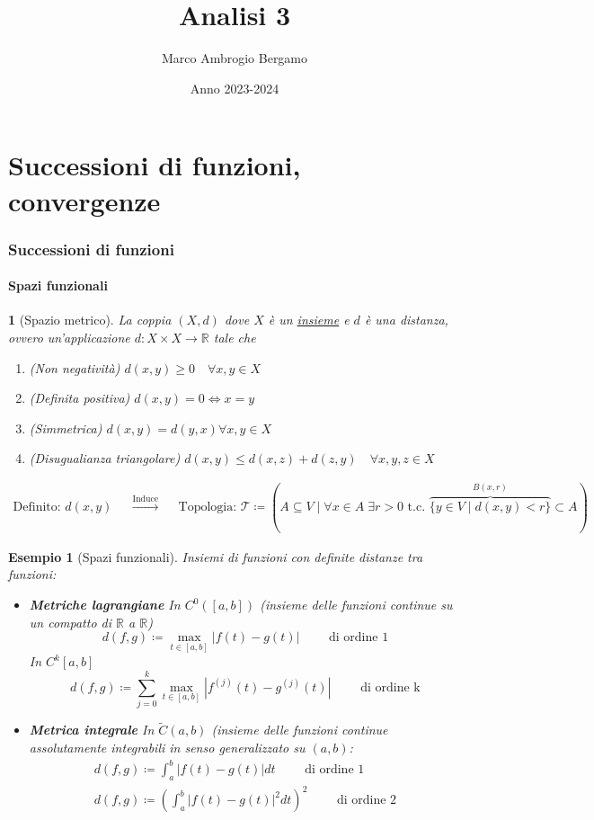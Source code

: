 \documentclass[a4paper,10pt]{article}
\title{\textbf{Analisi 3}}
\author{Marco Ambrogio Bergamo}
\date{Anno 2023-2024}
\newcommand{\re}{\mathbb{R}} %
\theoremstyle{indentdefinition}
\theoremstyle{indenttheorem}
\theoremstyle{myremark}
\newtheorem{es}{Esempio}
\theoremstyle{indentgeneral}
\newtheorem*{gen}{}
\begin{document}
\maketitle
\tableofcontents{}

\part{Successioni di funzioni, convergenze}
\section{Successioni di funzioni}
\subsection{Spazi funzionali}

\begin{gen}[Spazio metrico]
    La coppia $(X, d)$ dove $X$ è un \underline{insieme} e $d$ è una distanza, ovvero un'applicazione $d: X\times X \to \re$ tale che
    \begin{enumerate}
        \item (Non negatività) $d(x,y)\ge 0 \quad \forall x,y\in X$
        \item (Definita positiva) $d(x,y)=0 \iff x=y$
        \item (Simmetrica) $d(x,y)=d(y,x) \forall x,y\in X $
        \item (Disugualianza triangolare) $d(x,y)\le d(x,z)+d(z,y) \quad \forall x,y,z\in X$
    \end{enumerate}
    \begin{align*}
        \text{Definito: } d(x,y) & & \overset{\text{Induce}}{\longrightarrow} & &\text{Topologia: } \mathcal{T} \coloneqq (A\subseteq V \mid \forall x\in A \; \exists r>0 \text{ t.c. } \overbrace{\{y\in V\mid d(x,y)<r\}}^{B(x,r)}\subset A)
\end{align*}
\end{gen}

\begin{es}[Spazi funzionali] Insiemi di funzioni con definite distanze tra funzioni:
\begin{itemize}
    \item \textbf{Metriche lagrangiane} In $C^0([a,b])$ (insieme delle funzioni continue su un compatto di $\re$ a $\re$)
    $$d(f,g)\coloneqq\max_{t\in[a,b]}|f(t)-g(t)| \qquad\text{ di ordine 1} $$
    In $C^k[a,b]$
     $$d(f,g)\coloneqq\sum_{j=0}^{k}\max_{t\in[a,b]}|f^{(j)}(t)-g^{(j)}(t)|\qquad\text{ di ordine k} $$
     \item \textbf{Metrica integrale} In $\tilde{C}(a,b)$ (insieme delle funzioni continue assolutamente integrabili in senso generalizzato su $(a,b)$:
\begin{align*}
     d(f,g)\coloneqq\int_a^b|f(t)-g(t)|dt \qquad\text{ di ordine 1} \\
    d(f,g)\coloneqq\left(\int_a^b|f(t)-g(t)|^2dt\right)^2 \qquad\text{ di ordine 2}
\end{align*}
\end{itemize}
    
\end{es}
\end{document}
